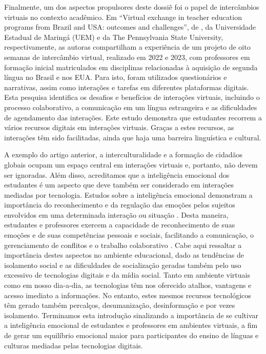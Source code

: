 \documentclass[portuguese]{textolivre}
\begin{document}
Finalmente, um dos aspectos propulsores deste dossiê foi o papel de intercâmbios virtuais no contexto acadêmico. Em “Virtual exchange in teacher education programs from Brazil and USA: outcomes and challenges”, de \textcite{calvo_virtual_2024}, da Universidade Estadual de Maringá (UEM) e da The Pennsylvania State University, respectivamente, as autoras compartilham a experiência de um projeto de oito semanas de intercâmbio virtual, realizado em 2022 e 2023, com professores em formação inicial matriculados em disciplinas relacionadas à aquisição de segunda língua no Brasil e nos EUA. Para isto, foram utilizados questionários e narrativas, assim como interações e tarefas em diferentes plataformas digitais. Esta pesquisa identifica os desafios e benefícios de interações virtuais, incluindo o processo colaborativo, a comunicação em um língua estrangeira e as dificuldades de agendamento das interações. Este estudo demonstra que estudantes recorrem a vários recursos digitais em interações virtuais. Graças a estes recursos, as interações têm sido facilitadas, ainda que haja uma barreira linguística e cultural. 

A exemplo do artigo anterior, a interculturalidade e a formação de cidadãos globais ocupam um espaço central em interações virtuais e, portanto, não devem ser ignoradas. Além disso, acreditamos que a inteligência emocional dos estudantes é um aspecto que deve também ser considerado em interações mediadas por tecnologia. Estudos sobre a inteligência emocional demonstram a importância do reconhecimento e da regulação das emoções pelos sujeitos envolvidos em uma determinada interação ou situação \cite{salomao2023}. Desta maneira, estudantes e professores exercem a capacidade de reconhecimento de suas emoções e de suas competências pessoais e sociais, facilitando a comunicação, o gerenciamento de conflitos e o trabalho colaborativo \cite{goleman_ei-based_2001}. Cabe aqui ressaltar a importância destes aspectos no ambiente educacional, dado as tendências de isolamento social e as dificuldades de socialização geradas também pelo uso excessivo de tecnologias digitais e da mídia social. Tanto em ambiente virtuais como em nosso dia-a-dia, as tecnologias têm nos oferecido atalhos, vantagens e acesso imediato a informações. No entanto, estes mesmos recursos tecnológicos têm gerado também percalços, desumanização, desinformação e por vezes isolamento. Terminamos esta introdução sinalizando a importância de se cultivar a inteligência emocional de estudantes e professores em ambientes virtuais, a fim de gerar um equilíbrio emocional maior para participantes do  ensino de línguas e culturas mediadas pelas tecnologias digitais.



\printbibliography\label{sec-bib}
\end{document}
